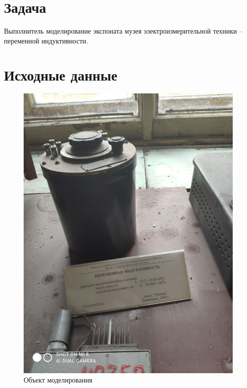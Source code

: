 \documentclass[a4paper,12pt]{article}
\begin{document}
    
    
    
    \tableofcontents
    
    \section{Задача}
    Выполнитель моделирование экспоната музея электроизмерительной техники -- переменной индуктивности.
    \section{Исходные данные}
    \begin{figure}[H]
        \centering
        \includegraphics[width=\linewidth]{ph_orig_2}
        \caption{Объект моделирования}
    \end{figure}
\end{document}
